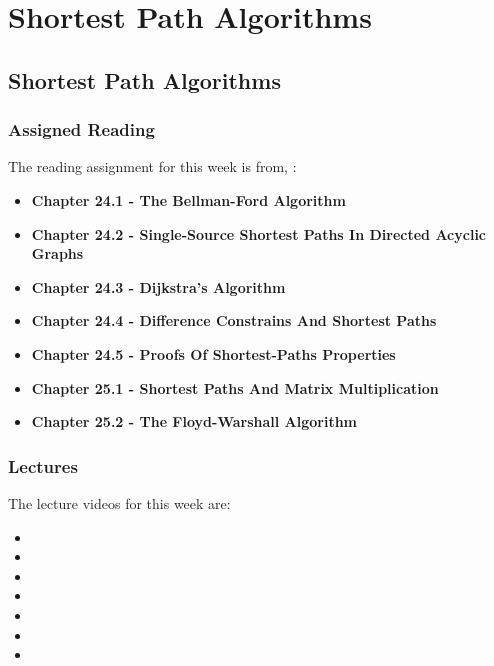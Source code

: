 \clearpage

\renewcommand{\ChapTitle}{Shortest Path Algorithms}
\renewcommand{\SectionTitle}{Shortest Path Algorithms}

\chapter{\ChapTitle}

\section{\SectionTitle}

\subsection{Assigned Reading}

The reading assignment for this week is from, \Textbook:

\begin{itemize}
    \item \textbf{Chapter 24.1 - The Bellman-Ford Algorithm}
    \item \textbf{Chapter 24.2 - Single-Source Shortest Paths In Directed Acyclic Graphs}
    \item \textbf{Chapter 24.3 - Dijkstra's Algorithm}
    \item \textbf{Chapter 24.4 - Difference Constrains And Shortest Paths}
    \item \textbf{Chapter 24.5 - Proofs Of Shortest-Paths Properties}
    \item \textbf{Chapter 25.1 - Shortest Paths And Matrix Multiplication}
    \item \textbf{Chapter 25.2 - The Floyd-Warshall Algorithm}
\end{itemize}

\subsection{Lectures}

The lecture videos for this week are:

\begin{itemize}
    \item {}
    \item {}
    \item {}
    \item {}
    \item {}
    \item {}
    \item {}
\end{itemize}

